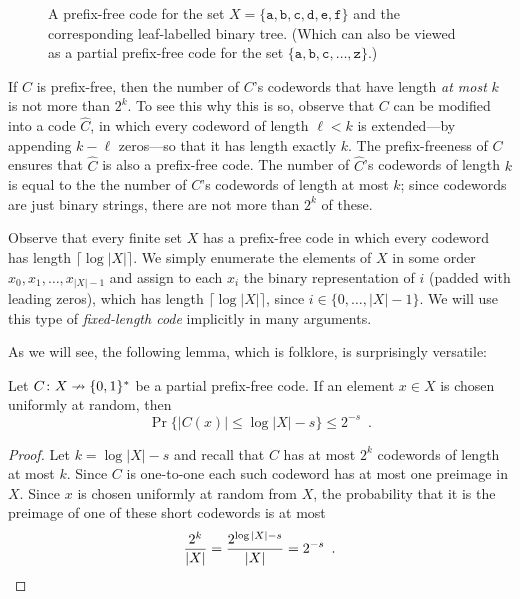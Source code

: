 \documentclass{patmorin}
\begin{document}
\begin{figure}
  \caption{A prefix-free code for the set
    $X=\{\mathtt{a},\mathtt{b},\mathtt{c},\mathtt{d},\mathtt{e},\mathtt{f}\}$
    and the corresponding leaf-labelled binary tree. (Which can also be viewed as a partial prefix-free code for the set $\{\mathtt{a},\mathtt{b},\mathtt{c},\ldots,\mathtt{z}\}$.)}
\end{figure}

If $C$ is prefix-free, then the number of $C$'s codewords that have length
\emph{at most} $k$ is not more than $2^k$. To see this why this is so,
observe that $C$ can be modified into a code $\hat C$, in which every
codeword of length $\ell <k$ is extended---by appending $k-\ell$ zeros---so that
it has length exactly $k$. The prefix-freeness of $C$ ensures that $\hat
C$ is also a prefix-free code. The number of $\hat C$'s codewords of
length $k$ is equal to the the number of $C$'s codewords of length at
most $k$; since codewords are just binary strings, there are not more
than $2^k$ of these.

Observe that every finite set $X$ has a prefix-free code in which every
codeword has length $\lceil\log |X|\rceil$. We simply enumerate the
elements of $X$ in some order $x_0,x_1,\ldots,x_{|X|-1}$ and assign to
each $x_i$ the binary representation of $i$ (padded with leading zeros),
which has length $\lceil\log |X|\rceil$, since $i\in\{0,\ldots,|X|-1\}$.
We will use this type of \emph{fixed-length code} implicitly in many arguments.


As we will see, the following lemma, which is folklore, is surprisingly
versatile:
\begin{lem}
  Let $C\colon X\nrightarrow \{0,1\}^*$ be a partial prefix-free code. If
  an element $x\in X$ is chosen uniformly at random, then 
  \[
  \Pr\{|C(x)|\le \log|X|-s\}\le 2^{-s} \enspace .
  \]
\end{lem}

\begin{proof}
  Let $k=\log|X|-s$ and recall that $C$ has at most $2^{k}$ codewords
  of length at most $k$.  Since $C$ is one-to-one each such codeword has
  at most one preimage in $X$.  Since $x$ is chosen uniformly at random
  from $X$, the probability that it is the preimage of one of these
  short codewords is at most
  \[
     \frac{2^k}{|X|} = \frac{2^{\log|X|-s}}{|X|} = 2^{-s} \enspace . \qedhere 
  \]
\end{proof}
\end{document}
